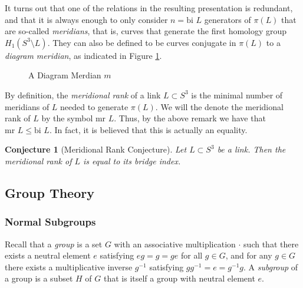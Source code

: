 \documentclass[a4paper]{article}
\newtheorem{conjecture}[theorem]{Conjecture}
\theoremstyle{definition}
\begin{document}
It turns out that one of the relations in the resulting presentation is redundant, and that it is always enough to only consider $n = \text{bi } L$ generators of $\pi(L)$ that are so-called \textit{meridians}, that is, curves that generate the first homology group $H_1(S^3 \setminus L)$. They can also be defined to be curves conjugate in $\pi(L)$ to a \textit{diagram meridian}, as indicated in Figure \ref{fig:diagram-meridian}.

\begin{figure}
\centering
{}
\caption{A Diagram Merdian $m$}
\label{fig:diagram-meridian}
\end{figure} 

By definition, the \textit{meridional rank} of a link $L \subset S^3$ is the minimal number of meridians of $L$ needed to generate $\pi(L)$. We will the denote the meridional rank of $L$ by the symbol $\text{mr } L$. Thus, by the above remark we have that $\text{mr } L \leq \text{bi } L$. In fact, it is believed that this is actually an equality.

\begin{conjecture}[Meridional Rank Conjecture]
Let $L \subset S^3$ be a link. Then the meridional rank of $L$ is equal to its bridge index.
\end{conjecture}

\subsection{Group Theory}
\subsubsection{Normal Subgroups}
Recall that a \textit{group} is a set $G$ with an associative multiplication $\cdot$ such that there exists a neutral element $e$ satisfying $eg = g = ge$ for all $g \in G$, and for any $g \in G$ there exists a multiplicative inverse $g^{-1}$ satisfying $gg^{-1} = e = g^{-1}g$. A \textit{subgroup} of a group is a subset $H$ of $G$ that is itself a group with neutral element $e$.
\end{document}
